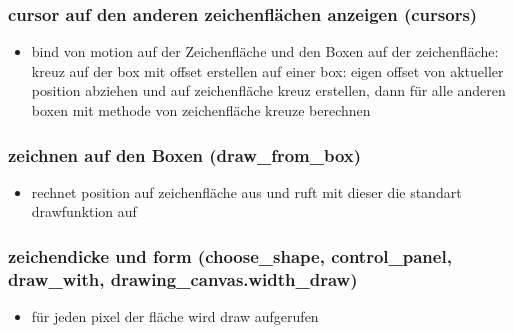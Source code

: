 \subsubsection{cursor auf den anderen zeichenflächen anzeigen (cursors)}
\label{subsubsec:cursor}

\begin{itemize}
\item bind von motion auf der Zeichenfläche und den Boxen auf der zeichenfläche:
kreuz auf der box mit offset erstellen auf einer box: eigen offset
von aktueller position abziehen und auf zeichenfläche kreuz erstellen,
dann für alle anderen boxen mit methode von zeichenfläche kreuze berechnen
\end{itemize}


\subsubsection{zeichnen auf den Boxen (draw\_from\_box)}
\label{subsubsec:zeichenAufBoxen}

\begin{itemize}
\item rechnet position auf zeichenfläche aus und ruft mit dieser die standart
drawfunktion auf
\end{itemize}


\subsubsection{zeichendicke und form (choose\_shape, control\_panel, draw\_with,
drawing\_canvas.width\_draw)}
\label{subsubsec:zeichendickeForm}

\begin{itemize}
\item für jeden pixel der fläche wird draw aufgerufen
\end{itemize}


